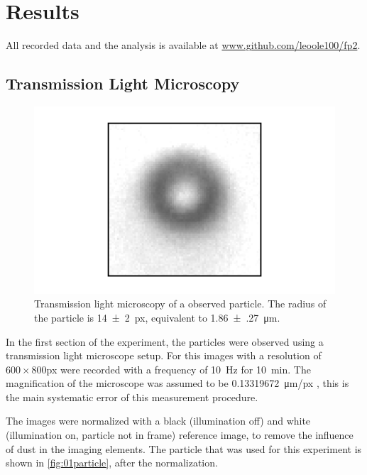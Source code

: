 \documentclass[
    twoside=false,
    twocolumn=true,
    fontsize=11pt,
]{scrarticle}
\begin{document}
\section{Results}
All recorded data and the analysis is available at \url{www.github.com/leoole100/fp2}.

\subsection{Transmission Light Microscopy}
\begin{figure}
    \centering
    \includegraphics{figures/01_01_1_particle.pdf}
    \caption{Transmission light microscopy of a observed particle. The radius of the particle is \SI{14(2)}{px}, equivalent to \SI{1.86(27)}{\micro m}.}
    \label{fig:01particle}
\end{figure}
In the first section of the experiment, the particles were observed using a transmission light microscope setup.
For this images with a resolution of $600\times 800$\si{px} were recorded with a frequency of \SI{10}{Hz} for \SI{10}{min}.
The magnification of the microscope was assumed to be \SI{0.13319672}{\micro m/px} \cite{instructions}, this is the main systematic error of this measurement procedure.

The images were normalized with a black (illumination off) and white (illumination on, particle not in frame) reference image, to remove the influence of dust in the imaging elements.
The particle that was used for this experiment is shown in \autoref{fig:01particle}, after the normalization.
\end{document}
